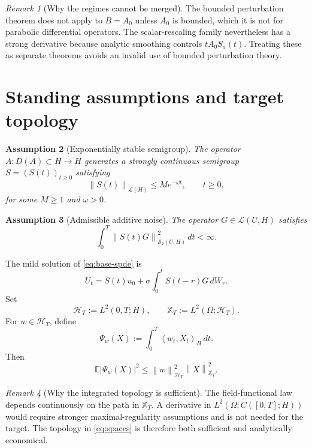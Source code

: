 \documentclass[11pt]{article}
\newtheorem{assumption}{Assumption}[section]
\theoremstyle{remark}
\newtheorem{remark}[assumption]{Remark}
\newcommand{\E}{\mathbb E}
\newcommand{\cL}{\mathcal L}
\newcommand{\cH}{\mathcal H_T}
\newcommand{\cX}{\mathbb X_T}
\newcommand{\HS}{\mathcal S_2}
\newcommand{\ip}[2]{\left\langle #1,#2\right\rangle}
\newcommand{\norm}[1]{\left\lVert #1\right\rVert}
\newcommand{\abs}[1]{\left\lvert #1\right\rvert}
\begin{document}
\begin{remark}[Why the regimes cannot be merged]
The bounded perturbation theorem does not apply to $B=A_0$ unless $A_0$ is bounded, which it is not for parabolic differential operators. The scalar-rescaling family nevertheless has a strong derivative because analytic smoothing controls $tA_0S_a(t)$. Treating these as separate theorems avoids an invalid use of bounded perturbation theory.
\end{remark}

\section{Standing assumptions and target topology}

\begin{assumption}[Exponentially stable semigroup]\label{ass:semigroup}
The operator $A:D(A)\subset H\to H$ generates a strongly continuous semigroup $S=(S(t))_{t\ge0}$ satisfying
\begin{equation}\label{eq:stable}
 \norm{S(t)}_{\cL(H)}\le Me^{-\omega t},
 \qquad t\ge0,
\end{equation}
for some $M\ge1$ and $\omega>0$.
\end{assumption}

\begin{assumption}[Admissible additive noise]\label{ass:noise}
The operator $G\in\cL(U,H)$ satisfies
\begin{equation}\label{eq:admissible}
 \int_0^T\norm{S(t)G}_{\HS(U,H)}^2\,dt<\infty.
\end{equation}
\end{assumption}

The mild solution of \eqref{eq:base-spde} is
\begin{equation}\label{eq:mild}
 U_t=S(t)u_0+\sigma\int_0^tS(t-r)G\,dW_r.
\end{equation}
Set
\begin{equation}\label{eq:spaces}
 \cH:=L^2(0,T;H),
 \qquad
 \cX:=L^2(\Omega;\cH).
\end{equation}
For $w\in\cH$, define
\begin{equation}\label{eq:functional}
 \Psi_w(X):=\int_0^T\ip{w_t}{X_t}_H\,dt.
\end{equation}
Then
\begin{equation}\label{eq:functional-cont}
 \E\abs{\Psi_w(X)}^2
 \le
 \norm{w}_{\cH}^2\norm{X}_{\cX}^2.
\end{equation}

\begin{remark}[Why the integrated topology is sufficient]
The field-functional law depends continuously on the path in $\cX$. A derivative in $L^2(\Omega;C([0,T];H))$ would require stronger maximal-regularity assumptions and is not needed for the target. The topology in \eqref{eq:spaces} is therefore both sufficient and analytically economical.
\end{remark}
\end{document}
